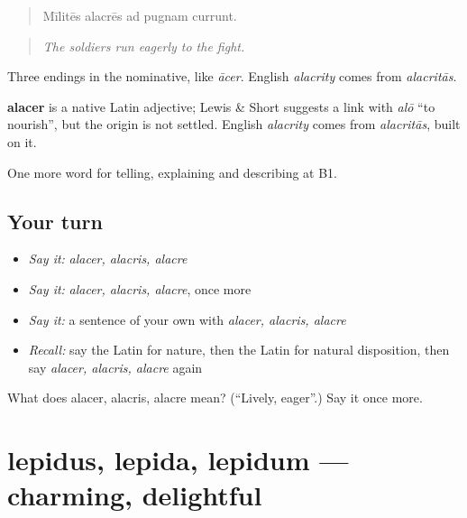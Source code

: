 \begin{quote}
Mīlitēs alacrēs ad pugnam currunt.
\end{quote}

\begin{quote}
\emph{The soldiers run eagerly to the fight.}
\end{quote}

Three endings in the nominative, like \emph{ācer}. English \emph{alacrity} comes from \emph{alacritās}.

\begin{cousinweb}
\textbf{alacer} is a native Latin adjective; Lewis \& Short suggests a link with \emph{alō} \textquotedblleft{}to nourish\textquotedblright{}, but the origin is not settled. English \emph{alacrity} comes from \emph{alacritās}, built on it.
\end{cousinweb}

\begin{grammarlens}[title={What you've built}]
One more word for telling, explaining and describing at B1.
\end{grammarlens}

\subsection*{Your turn}
\begin{itemize}
\raggedright
  \item \emph{Say it:} \emph{alacer, alacris, alacre}
  \item \emph{Say it:} \emph{alacer, alacris, alacre}, once more
  \item \emph{Say it:} a sentence of your own with \emph{alacer, alacris, alacre}
  \item \emph{Recall:} say the Latin for nature, then the Latin for natural disposition, then say \emph{alacer, alacris, alacre} again
\end{itemize}

\begin{tcolorbox}[breakable,colback=teal!4,colframe=teal!35!black,title={Before you move on}]
What does alacer, alacris, alacre mean? (\textquotedblleft{}Lively, eager\textquotedblright{}.) Say it once more.
\end{tcolorbox}
\section[lepidus, lepida, lepidum]{lepidus, lepida, lepidum — charming, delightful}

\label{lesson:LA-C503-lepidus}



